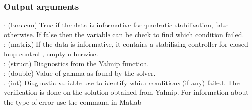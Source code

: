 \subsubsection*{Output arguments}
\textbf{}: (boolean) True if the data is informative for quadratic stabilisation, false otherwise. If false then the  variable can be check to find which condition failed. \\
\textbf{}: (matrix) If the data is informative, it contains a stabilising controller  for closed loop control , empty otherwise.\\
\textbf{}: (struct) Diagnostics from the Yalmip  function. \\
\textbf{}: (double) Value of gamma as found by the solver. \\
\textbf{}: (int) Diagnostic variable use to identify which conditions (if any) failed. The verification is done on the solution obtained from Yalmip. For information about the type of error use the  command in Matlab


